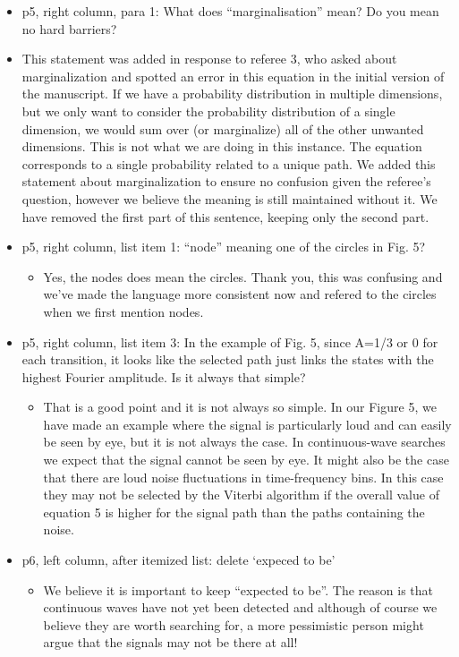 \documentclass[a4paper, 10pt]{letter}
\begin{document}
\begin{itemize}
\item p5, right column, para 1: What does ``marginalisation'' mean? Do you mean no hard barriers?
\item This statement was added in response to referee 3, who asked about marginalization and spotted an error in this equation in the initial version of the manuscript. If we have a probability distribution in multiple dimensions, but we only want to consider the probability distribution of a single dimension, we would sum over (or marginalize) all of the other unwanted dimensions. This is not what we are doing in this instance. The equation corresponds to a single probability related to a unique path. We added this statement about marginalization to ensure no confusion given the referee's question, however we believe the meaning is still maintained without it. We have removed the first part of this sentence, keeping only the second part. 

\item p5, right column, list item 1: ``node'' meaning one of the circles in Fig. 5? 
\begin{itemize}
\item Yes, the nodes does mean the circles. Thank you, this was confusing and we've made the language more consistent now and refered to the circles when we first mention nodes.
\end{itemize}

\item p5, right column, list item 3: In the example of Fig. 5, since A=1/3 or 0 for each transition, it looks like the selected path just links the states with the highest Fourier amplitude. Is it always that simple?
\begin{itemize}
\item That is a good point and it is not always so simple. In our Figure 5, we have made an example where the signal is particularly loud and can easily be seen by eye, but it is not always the case. In continuous-wave searches we expect that the signal cannot be seen by eye. It might also be the case that there are loud noise fluctuations in time-frequency bins. In this case they may not be selected by the Viterbi algorithm if the overall value of equation 5 is higher for the signal path than the paths containing the noise. 
\end{itemize}

\item p6, left column, after itemized list: delete `expeced to be' 
\begin{itemize}
\item We believe it is important to keep ``expected to be''. The reason is that continuous waves have not yet been detected and although of course we believe they are worth searching for, a more pessimistic person might argue that the signals may not be there at all! 
\end{itemize}


\end{itemize}
\end{document}
